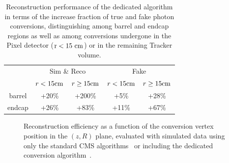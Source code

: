 \documentclass[a4paper]{jpconf}
\begin{document}
\begin{table}[htdp]
\caption{Reconstruction performance of the dedicated algorithm in terms of the increase fraction of true and fake photon conversions, distinguishing among barrel and endcap regions as well as among conversions undergone in the Pixel detector ($\rm r < 15~cm$) or in the remaining Tracker volume.
}
\begin{center}
\begin{tabular}{c|c|c|c|c}
& \multicolumn{2}{c}{Sim \& Reco} & \multicolumn{2}{|c}{Fake}  \\
& $r < 15 \rm cm$ & $r \ge 15 \rm cm$ & $r < 15 \rm cm$ & $r \ge 15 \rm cm$ \\
\hline
barrel & +20\% & +200\% & +5\% & +28\% \\
\hline
endcap & +26\% & +83\% & +11\% & +67\% 
\end{tabular}
\end{center}
\label{tab:perfTable}
\end{table}%

\begin{figure}[h]
\centering
{}
\caption{Reconstruction efficiency as a function of the conversion vertex position in the $(z,R)$ plane, evaluated with simulated data using only the standard CMS algorithms~  or including the dedicated conversion algorithm~. }
\label{fig:RZCoverage}
\end{figure}
\end{document}
